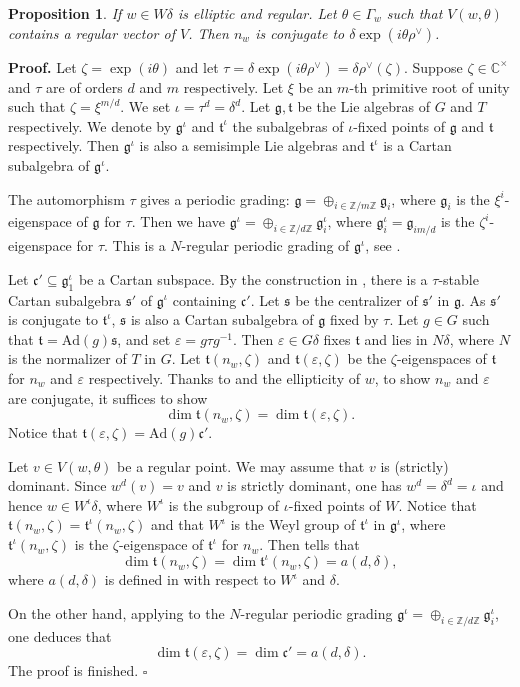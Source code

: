 \documentclass[10pt,leqno]{article}
\newtheorem{proposition}[equation]{Proposition}
\newcommand{\qed}{\hfill $\square$ \medskip}
\newenvironment{proof}[1][Proof]{\noindent\textbf{#1.} }{\qed}
\newcommand{\Ad}{\text{Ad}}
\renewcommand{\t}{\mathfrak t}
\def\fg{\mathfrak g}
\def\fc{\mathfrak c}
\def\ft{\mathfrak t}
\def\fs{\mathfrak s}
\def\G{\Gamma}
\def\d{\delta}
\def\t{\tau}
\def\z{\zeta}
\def\i{^{-1}}
\begin{document}
\begin{proposition}\label{regular} If $w \in W\d$ is elliptic and
regular. Let $\theta \in \G_w$ such that $V(w, \theta)$ contains a
regular vector of $V$. Then $n_w$ is conjugate to $\d \exp(i \theta
\rho^\vee)$.
\end{proposition}
\begin{proof} Let $\zeta=\exp(i \theta)$ and let $\t=\d \exp(i \theta
\rho^\vee)=\d \rho^\vee(\zeta)$. Suppose $\zeta \in \mathbb C^\times$
and $\t$ are of orders $d$ and $m$ respectively. Let $\xi$ be an
$m$-th primitive root of unity such that $\zeta=\xi^{m/d}$. We set
$\iota=\tau^d=\delta^d$. Let $\fg, \ft$ be the Lie algebras of $G$ and
$T$ respectively. We denote by $\fg^\iota$ and $\ft^\iota$ the
subalgebras of $\iota$-fixed points of $\fg$ and $\ft$
respectively. Then $\fg^\iota$ is also a semisimple Lie algebras and
$\ft^\iota$ is a Cartan subalgebra of $\fg^\iota$.
	
	The automorphism $\t$ gives a periodic grading: $\fg=\oplus_{i
\in \mathbb Z/m\mathbb Z} \fg_i$, where $\fg_i$ is the
$\xi^i$-eigenspace of $\fg$ for $\t$. Then we have $\fg^\iota =
\oplus_{i \in \mathbb Z / d\mathbb Z} \fg^\iota_i$, where
$\fg^\iota_i=\fg_{im/d}$ is the $\zeta^i$-eigenspace for $\t$. This is
a $N$-regular periodic grading of ${\fg}^{\iota}$, see \cite[Section
3]{panyushev}.
	
	Let $\fc' \subseteq \fg^\iota_1$ be a Cartan subspace. By the
construction in \cite[Subsection 3.1]{rgly}, there is a $\t$-stable
Cartan subalgebra $\fs'$ of $\fg^\iota$ containing $\fc'$. Let $\fs$
be the centralizer of $\fs'$ in $\fg$. As $\fs'$ is conjugate to
$\ft^\iota$, $\fs$ is also a Cartan subalgebra of $\fg$ fixed by
$\t$. Let $g \in G$ such that $\ft=\Ad(g) \fs$, and set $\varepsilon=g
\t g\i$. Then $\varepsilon \in G \d$ fixes $\ft$ and lies in $N \d$,
where $N$ is the normalizer of $T$ in $G$. Let $\ft(n_w, \z)$ and
$\ft(\varepsilon, \z)$ be the $\z$-eigenspaces of $\ft$ for $n_w$ and
$\varepsilon$ respectively. Thanks to \cite[Theorem 6.4 (iv)]{springer_regular} and
the ellipticity of $w$, to show $n_w$ and $\varepsilon$ are conjugate,
it suffices to show $$\dim \ft(n_w, \z)= \dim \ft(\varepsilon, \z).$$
Notice that $\ft(\varepsilon, \z)=\Ad(g) \fc'$.
	
	Let $v \in V(w, \theta)$ be a regular point. We may assume
that $v$ is (strictly) dominant. Since $w^d(v)=v$ and $v$ is strictly
dominant, one has $w^d=\d^d=\iota$ and hence $w \in W^\iota \d$, where
$W^\iota$ is the subgroup of $\iota$-fixed points of $W$. Notice that
$\ft(n_w, \z)=\ft^\iota(n_w, \z)$ and that $W^\iota$ is the Weyl group
of $\ft^\iota$ in $\fg^\iota$, where $\ft^\iota(n_w, \z)$ is the
$\z$-eigenspace of $\ft^\iota$ for $n_w$. Then \cite[Theorem 6.4
(ii)]{springer_regular} tells that $$\dim \ft(n_w, \z) = \dim \ft^\iota(n_w, \z)=
a(d, \d),$$ where $a(d, \d)$ is defined in \cite[Section 6]{springer_regular} with
respect to $W^\iota$ and $\d$.
	
	On the other hand, applying \cite[Theorem 3.3 (v)]{panyushev} to the
$N$-regular periodic grading $\fg^\iota = \oplus_{i \in \mathbb Z /
d\mathbb Z} \fg^\iota_i$, one deduces that $$\dim \ft(\varepsilon, \z)
= \dim \fc' = a(d, \d).$$ The proof is finished.
\end{proof}
\end{document}
